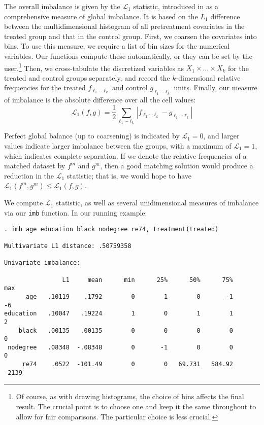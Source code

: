 \documentclass[11pt]{article}
\begin{document}
The overall imbalance is given by the $\mathcal L_1$ statistic,
introduced in \citet{IacKinPor11c} as a comprehensive measure of global
imbalance.  It is based on the $L_1$ difference between the
multidimensional histogram of all pretreatment covariates in the
treated group and that in the control group.  First, we coarsen the
covariates into bins. To use this measure, we require a list of bin
sizes for the numerical variables.  Our functions compute these
automatically, or they can be set by the user.\footnote{Of course, as
  with drawing histograms, the choice of bins affects the final
  result.  The crucial point is to choose one and keep it the same
  throughout to allow for fair comparisons.  The particular choice is
  less crucial.}  Then, we cross-tabulate the discretized variables as
$X_1\times \dots \times X_k$ for the treated and control groups
separately, and record the $k$-dimensional relative frequencies for
the treated $f_{\ell_1\cdots \ell_k}$ and control $g_{\ell_1\cdots
  \ell_k}$ units.  Finally, our measure of imbalance is the absolute
difference over all the cell values:
\begin{equation}
  \mathcal L_1(f,g) = \frac12 \sum_{\ell_1  \cdots \ell_k} 
  |f_{\ell_1\cdots \ell_k} - g_{\ell_1\cdots \ell_k}|
  \label{eq:L1}
\end{equation}

Perfect global balance (up to coarsening) is indicated by $\mathcal
L_1=0$, and larger values indicate larger imbalance between the
groups, with a maximum of $\mathcal L_1=1$, which indicates complete
separation. If we denote the relative frequencies of a matched dataset
by $f^m$ and $g^m$, then a good matching solution would produce a
reduction in the $\mathcal L_1$ statistic; that is, we would hope to
have $\mathcal L_1(f^m, g^m) \leq \mathcal L_1(f,g)$.

We compute $\mathcal L_1$ statistic, as well as several unidimensional
measures of imbalance via our \texttt{imb} function.  In our
running example:

\begin{verbatim}
. imb age education black nodegree re74, treatment(treated)

Multivariate L1 distance: .50759358

Univariate imbalance:

                L1     mean      min      25%      50%      75%      max
      age   .10119    .1792        0        1        0       -1       -6
education   .10047   .19224        1        0        1        1        2
    black   .00135   .00135        0        0        0        0        0
 nodegree   .08348  -.08348        0       -1        0        0        0
     re74    .0522  -101.49        0        0   69.731   584.92    -2139

\end{verbatim}
\end{document}
